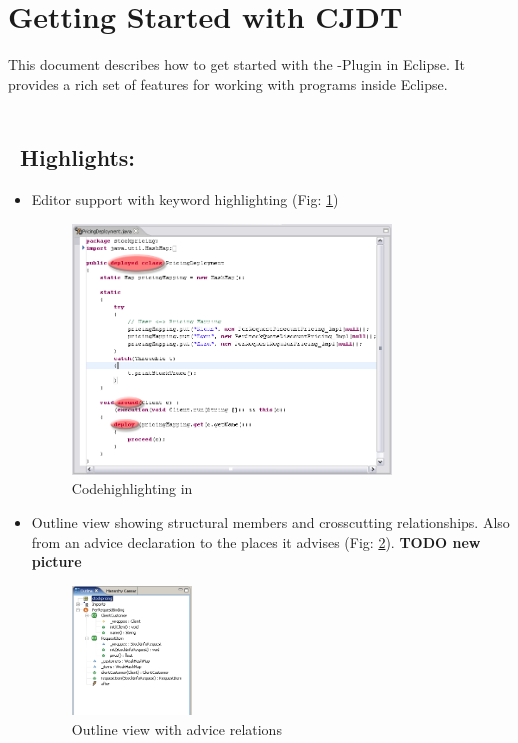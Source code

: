 \section{Getting Started with CJDT}
This document describes how to get started with the \cjdt -Plugin in Eclipse. It provides a rich set of features for working with \caesarj programs inside Eclipse.\\\\
\subsection{\cjdt ~Highlights:}
\begin{itemize}
	\item Editor support with keyword highlighting (Fig: \ref{fig:hilight})
	
\begin{figure}[htbp]
	\centering
		\includegraphics[width=0.80\textwidth]{images/hilight.png}
	\caption{Codehighlighting in \cjdt}
	\label{fig:hilight}
\end{figure}

  \item Outline view showing structural members and crosscutting relationships. Also from an advice declaration to the places it advises (Fig: \ref{fig:outline}). \textbf{TODO new picture}

\begin{figure}[htbp]
	\centering
		\includegraphics[width=0.30\textwidth]{images/outline.png}
	\caption{Outline view with advice relations}
	\label{fig:outline}
\end{figure}


\end{itemize}
